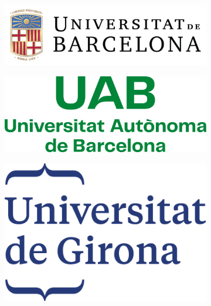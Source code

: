 \begin{titlepage}

\begin{figure}[h]
    \begin{subfigure}[h]{0.2\textwidth}
        \includegraphics[width=\textwidth]{images/ub_logo.png}
    \end{subfigure}
    \hfill
    \begin{subfigure}[h]{0.2\textwidth}
        \includegraphics[width=\textwidth]{images/uab_logo.png}
    \end{subfigure}
    \hfill
    \begin{subfigure}[h]{0.12\textwidth}
        \includegraphics[width=\textwidth]{images/uni_girona.png}
    \end{subfigure}
    \hfill
    \begin{subfigure}[h]{0.2\textwidth}

\end{subfigure}
\end{figure}
\end{titlepage}
